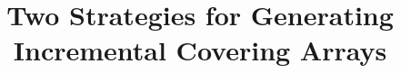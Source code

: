 \documentclass[conference]{IEEEtran}
\theoremstyle{definition}
\begin{document}
%
\title{Two Strategies for Generating Incremental Covering Arrays}


\end{document}
